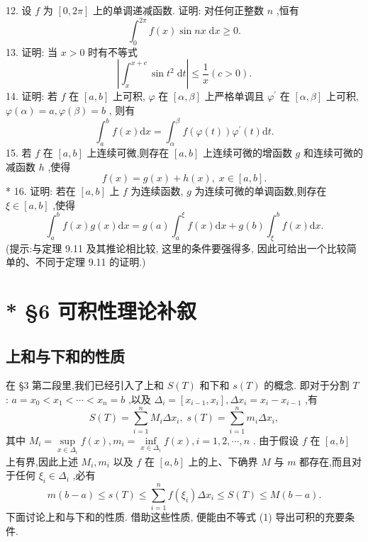 12. 设 \(f\) 为 \(\left\lbrack  {0,{2\pi }}\right\rbrack\) 上的单调递减函数. 证明: 对任何正整数 \(n\) ,恒有
\[
{\int }_{0}^{2\pi }f\left( x\right) \sin {nx}\mathrm{\;d}x \geq  0.
\]
13. 证明: 当 \(x > 0\) 时有不等式
\[
\left| {{\int }_{x}^{x + c}\sin {t}^{2}\mathrm{\;d}t}\right|  \leq  \frac{1}{x}\left( {c > 0}\right) .
\]
14. 证明: 若 \(f\) 在 \(\left\lbrack  {a,b}\right\rbrack\) 上可积, \(\varphi\) 在 \(\left\lbrack  {\alpha ,\beta }\right\rbrack\) 上严格单调且 \({\varphi }^{\prime }\) 在 \(\left\lbrack  {\alpha ,\beta }\right\rbrack\) 上可积, \(\varphi \left( \alpha \right)  = a,\varphi \left( \beta \right)  = b\) , 则有
\[
{\int }_{a}^{b}f\left( x\right) \mathrm{d}x = {\int }_{\alpha }^{\beta }f\left( {\varphi \left( t\right) }\right) {\varphi }^{\prime }\left( t\right) \mathrm{d}t.
\]
15. 若 \(f\) 在 \(\left\lbrack  {a,b}\right\rbrack\) 上连续可微,则存在 \(\left\lbrack  {a,b}\right\rbrack\) 上连续可微的增函数 \(g\) 和连续可微的减函数 \(h\) ,使得
\[
f\left( x\right)  = g\left( x\right)  + h\left( x\right) ,\;x \in  \left\lbrack  {a,b}\right\rbrack  .
\]
* 16. 证明: 若在 \(\left\lbrack  {a,b}\right\rbrack\) 上 \(f\) 为连续函数, \(g\) 为连续可微的单调函数,则存在 \(\xi  \in  \left\lbrack  {a,b}\right\rbrack\) ,使得
\[
{\int }_{a}^{b}f\left( x\right) g\left( x\right) \mathrm{d}x = g\left( a\right) {\int }_{a}^{\xi }f\left( x\right) \mathrm{d}x + g\left( b\right) {\int }_{\xi }^{b}f\left( x\right) \mathrm{d}x.
\]
(提示:与定理 9.11 及其推论相比较, 这里的条件要强得多, 因此可给出一个比较简单的、不同于定理 9.11 的证明.)

\section{* §6 可积性理论补叙}

\subsection{上和与下和的性质}

在 §3 第二段里,我们已经引入了上和 \(S\left( T\right)\) 和下和 \(s\left( T\right)\) 的概念. 即对于分割 \(T\) : \(a = {x}_{0} < {x}_{1} < \cdots  < {x}_{n} = b\) ,以及 \({\Delta }_{i} = \left\lbrack  {{x}_{i - 1},{x}_{i}}\right\rbrack  ,\Delta {x}_{i} = {x}_{i} - {x}_{i - 1}\) ,有
\[
S\left( T\right)  = \mathop{\sum }\limits_{{i = 1}}^{n}{M}_{i}\Delta {x}_{i},\;s\left( T\right)  = \mathop{\sum }\limits_{{i = 1}}^{n}{m}_{i}\Delta {x}_{i},
\]
其中 \({M}_{i} = \mathop{\sup }\limits_{{x \in  {\Delta }_{i}}}f\left( x\right) ,{m}_{i} = \mathop{\inf }\limits_{{x \in  {\Delta }_{i}}}f\left( x\right) ,i = 1,2,\cdots ,n\) . 由于假设 \(f\) 在 \(\left\lbrack  {a,b}\right\rbrack\) 上有界,因此上述 \({M}_{i},{m}_{i}\) 以及 \(f\) 在 \(\left\lbrack  {a,b}\right\rbrack\) 上的上、下确界 \(M\) 与 \(m\) 都存在,而且对于任何 \({\xi }_{i} \in  {\Delta }_{i}\) ,必有
\[
m\left( {b - a}\right)  \leq  s\left( T\right)  \leq  \mathop{\sum }\limits_{{i = 1}}^{n}f\left( {\xi }_{i}\right) \Delta {x}_{i} \leq  S\left( T\right)  \leq  M\left( {b - a}\right) . \tag{1}
\]
下面讨论上和与下和的性质. 借助这些性质, 便能由不等式 (1) 导出可积的充要条件.

